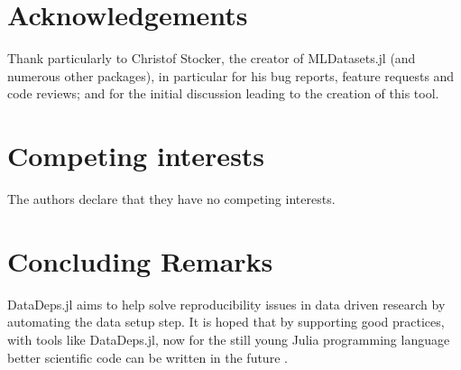 \documentclass{book}
\begin{document}
\section*{Acknowledgements}
Thank particularly to Christof Stocker, the creator of MLDatasets.jl (and numerous other packages), in particular for his bug reports, feature requests and code reviews; and for the initial discussion leading to the creation of this tool.


\section*{Competing interests}
The authors declare that they have no competing interests.

\section {Concluding Remarks} 
DataDeps.jl aims to help solve reproducibility issues in data driven research by automating the data setup step. 
It is hoped that by supporting good practices, with tools like DataDeps.jl, now for the still young Julia programming language 
better scientific code can be written in the future . 
\end{document}
